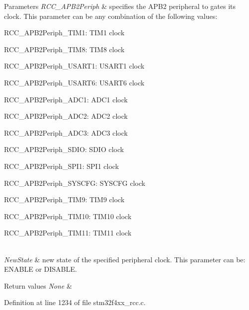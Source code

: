 \begin{DoxyParams}{Parameters}
{\em R\+C\+C\+\_\+\+A\+P\+B2\+Periph} & specifies the A\+P\+B2 peripheral to gates its clock. This parameter can be any combination of the following values\+: \begin{DoxyItemize}
\item R\+C\+C\+\_\+\+A\+P\+B2\+Periph\+\_\+\+T\+I\+M1\+: T\+I\+M1 clock \item R\+C\+C\+\_\+\+A\+P\+B2\+Periph\+\_\+\+T\+I\+M8\+: T\+I\+M8 clock \item R\+C\+C\+\_\+\+A\+P\+B2\+Periph\+\_\+\+U\+S\+A\+R\+T1\+: U\+S\+A\+R\+T1 clock \item R\+C\+C\+\_\+\+A\+P\+B2\+Periph\+\_\+\+U\+S\+A\+R\+T6\+: U\+S\+A\+R\+T6 clock \item R\+C\+C\+\_\+\+A\+P\+B2\+Periph\+\_\+\+A\+D\+C1\+: A\+D\+C1 clock \item R\+C\+C\+\_\+\+A\+P\+B2\+Periph\+\_\+\+A\+D\+C2\+: A\+D\+C2 clock \item R\+C\+C\+\_\+\+A\+P\+B2\+Periph\+\_\+\+A\+D\+C3\+: A\+D\+C3 clock \item R\+C\+C\+\_\+\+A\+P\+B2\+Periph\+\_\+\+S\+D\+IO\+: S\+D\+IO clock \item R\+C\+C\+\_\+\+A\+P\+B2\+Periph\+\_\+\+S\+P\+I1\+: S\+P\+I1 clock \item R\+C\+C\+\_\+\+A\+P\+B2\+Periph\+\_\+\+S\+Y\+S\+C\+FG\+: S\+Y\+S\+C\+FG clock \item R\+C\+C\+\_\+\+A\+P\+B2\+Periph\+\_\+\+T\+I\+M9\+: T\+I\+M9 clock \item R\+C\+C\+\_\+\+A\+P\+B2\+Periph\+\_\+\+T\+I\+M10\+: T\+I\+M10 clock \item R\+C\+C\+\_\+\+A\+P\+B2\+Periph\+\_\+\+T\+I\+M11\+: T\+I\+M11 clock \end{DoxyItemize}
\\
\hline
{\em New\+State} & new state of the specified peripheral clock. This parameter can be\+: E\+N\+A\+B\+LE or D\+I\+S\+A\+B\+LE. \\
\hline
\end{DoxyParams}

\begin{DoxyRetVals}{Return values}
{\em None} & \\
\hline
\end{DoxyRetVals}


Definition at line 1234 of file stm32f4xx\+\_\+rcc.\+c.

\mbox{\label{group___r_c_c_ga30365b9e0b4c5d7e98c2675c862ddd7e}} 
